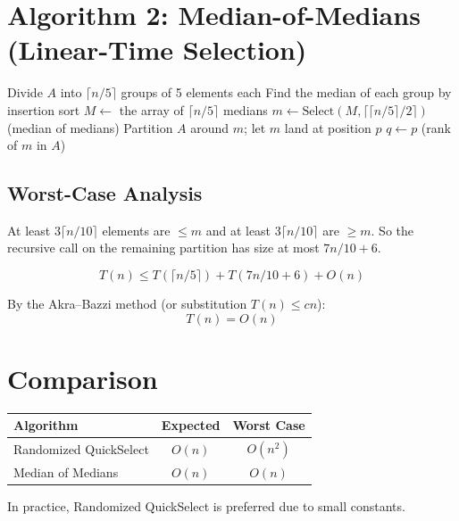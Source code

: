 \documentclass[12pt]{article}
\begin{document}
\section{Algorithm 2: Median-of-Medians (Linear-Time Selection)}

\begin{algorithm}[H]
\SetAlgoLined
{}
Divide $A$ into $\lceil n/5 \rceil$ groups of 5 elements each\;
Find the median of each group by insertion sort\;
$M \leftarrow$ the array of $\lceil n/5 \rceil$ medians\;
$m \leftarrow \text{Select}(M, \lceil\lceil n/5 \rceil / 2\rceil)$ (median of medians)\;
Partition $A$ around $m$; let $m$ land at position $p$\;
$q \leftarrow p$ (rank of $m$ in $A$)\;
\caption{Median-of-Medians Selection}
\end{algorithm}

\subsection*{Worst-Case Analysis}

At least $3\lceil n/10 \rceil$ elements are $\leq m$ and at least $3\lceil n/10 \rceil$ are $\geq m$.
So the recursive call on the remaining partition has size at most $7n/10 + 6$.

\[
  T(n) \leq T(\lceil n/5 \rceil) + T(7n/10 + 6) + O(n)
\]

By the Akra--Bazzi method (or substitution $T(n) \leq cn$):
\[
  \boxed{T(n) = O(n)}
\]

\section{Comparison}

\begin{center}
\begin{tabular}{lcc}
\toprule
Algorithm & Expected & Worst Case \\
\midrule
Randomized QuickSelect & $O(n)$ & $O(n^2)$ \\
Median of Medians & $O(n)$ & $O(n)$ \\
\bottomrule
\end{tabular}
\end{center}

In practice, Randomized QuickSelect is preferred due to small constants.
\end{document}
